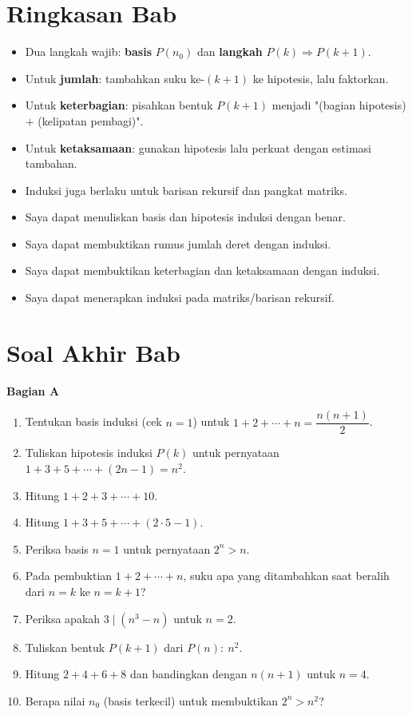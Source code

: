\documentclass[11pt,a4paper]{report}
\theoremstyle{gaya}
\newcommand{\bagiansoal}[2]{%
  \par\medskip\noindent
  {\large\bfseries\color{biru}Bagian #1}\par\smallskip
  \addcontentsline{toc}{subsection}{Bagian #1}}
\newcommand{\cek}{\ding{113}\ } %
\begin{document}
\section*{Ringkasan Bab}
\begin{itemize}[leftmargin=*,topsep=2pt]
  \item Dua langkah wajib: \textbf{basis} $P(n_0)$ dan \textbf{langkah} $P(k)\Rightarrow P(k+1)$.
  \item Untuk \textbf{jumlah}: tambahkan suku ke-$(k+1)$ ke hipotesis, lalu faktorkan.
  \item Untuk \textbf{keterbagian}: pisahkan bentuk $P(k+1)$ menjadi "(bagian hipotesis) $+$ (kelipatan pembagi)".
  \item Untuk \textbf{ketaksamaan}: gunakan hipotesis lalu perkuat dengan estimasi tambahan.
  \item Induksi juga berlaku untuk barisan rekursif dan pangkat matriks.
\end{itemize}

\begin{refleksi}
\begin{itemize}[leftmargin=*,topsep=2pt]
  \item[\cek] Saya dapat menuliskan basis dan hipotesis induksi dengan benar.
  \item[\cek] Saya dapat membuktikan rumus jumlah deret dengan induksi.
  \item[\cek] Saya dapat membuktikan keterbagian dan ketaksamaan dengan induksi.
  \item[\cek] Saya dapat menerapkan induksi pada matriks/barisan rekursif.
\end{itemize}
\end{refleksi}

\section*{Soal Akhir Bab \thechapter}

\bagiansoal{A}{(Fundamental --- setara SNBT Dasar)}
\begin{enumerate}[leftmargin=*]
  \item Tentukan basis induksi (cek $n=1$) untuk $1+2+\cdots+n=\dfrac{n(n+1)}{2}$.
  \item Tuliskan hipotesis induksi $P(k)$ untuk pernyataan $1+3+5+\cdots+(2n-1)=n^2$.
  \item Hitung $1+2+3+\cdots+10$.
  \item Hitung $1+3+5+\cdots+(2\cdot5-1)$.
  \item Periksa basis $n=1$ untuk pernyataan $2^n>n$.
  \item Pada pembuktian $1+2+\cdots+n$, suku apa yang ditambahkan saat beralih dari $n=k$ ke $n=k+1$?
  \item Periksa apakah $3\mid(n^3-n)$ untuk $n=2$.
  \item Tuliskan bentuk $P(k+1)$ dari $P(n):\ n^2$.
  \item Hitung $2+4+6+8$ dan bandingkan dengan $n(n+1)$ untuk $n=4$.
  \item Berapa nilai $n_0$ (basis terkecil) untuk membuktikan $2^n>n^2$?
\end{enumerate}
\end{document}
